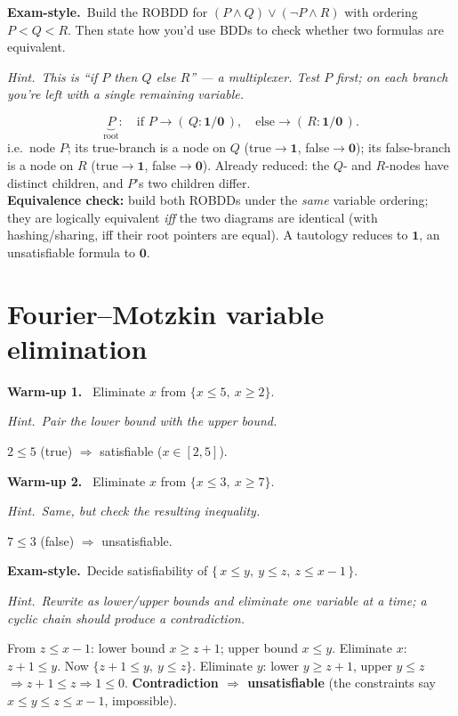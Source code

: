 \documentclass[11pt,a4paper]{article}
\newcommand{\hint}[1]{\par{\small\textcolor{accent}{\textit{Hint.}}\ \textit{#1}}\par\smallskip}
\newcommand{\warm}[1]{\smallskip\textbf{\textcolor{hi}{Warm-up #1.}}\ }
\newcommand{\exam}{\smallskip\textbf{\textcolor{warn}{Exam-style.}}\ }
\begin{document}
\exam Build the ROBDD for $(P\wedge Q)\vee(\neg P\wedge R)$ with ordering $P<Q<R$. Then state how you'd use BDDs to check whether two formulas are equivalent.
\hint{This is ``if $P$ then $Q$ else $R$'' --- a multiplexer. Test $P$ first; on each branch you're left with a single remaining variable.}
\begin{sol}
\[
\underbrace{P}_{\text{root}}:\quad \text{if } P \to (\,Q: \mathbf 1/\mathbf 0\,),\quad \text{else} \to (\,R:\mathbf 1/\mathbf 0\,).
\]
i.e.\ node $P$; its true-branch is a node on $Q$ (true$\to\mathbf 1$, false$\to\mathbf 0$); its false-branch is a node on $R$ (true$\to\mathbf 1$, false$\to\mathbf 0$). Already reduced: the $Q$- and $R$-nodes have distinct children, and $P$'s two children differ.\\[3pt]
\textbf{Equivalence check:} build both ROBDDs under the \emph{same} variable ordering; they are logically equivalent \emph{iff} the two diagrams are identical (with hashing/sharing, iff their root pointers are equal). A tautology reduces to $\mathbf 1$, an unsatisfiable formula to $\mathbf 0$.
\end{sol}

\section{Fourier--Motzkin variable elimination}

\warm{1} Eliminate $x$ from $\{x\le 5,\ x\ge 2\}$.
\hint{Pair the lower bound with the upper bound.}
\begin{sol}$2\le 5$ (true) $\Rightarrow$ satisfiable ($x\in[2,5]$).\end{sol}

\warm{2} Eliminate $x$ from $\{x\le 3,\ x\ge 7\}$.
\hint{Same, but check the resulting inequality.}
\begin{sol}$7\le 3$ (false) $\Rightarrow$ unsatisfiable.\end{sol}

\exam Decide satisfiability of $\{\,x\le y,\ y\le z,\ z\le x-1\,\}$.
\hint{Rewrite as lower/upper bounds and eliminate one variable at a time; a cyclic chain should produce a contradiction.}
\begin{sol}
From $z\le x-1$: lower bound $x\ge z+1$; upper bound $x\le y$. Eliminate $x$: $z+1\le y$. Now $\{z+1\le y,\ y\le z\}$. Eliminate $y$: lower $y\ge z+1$, upper $y\le z$ $\Rightarrow z+1\le z\Rightarrow 1\le 0$. \textbf{Contradiction $\Rightarrow$ unsatisfiable} (the constraints say $x\le y\le z\le x-1$, impossible).
\end{sol}
\end{document}
